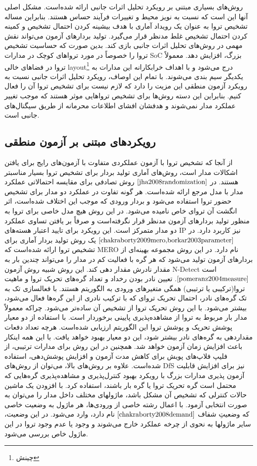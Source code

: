 روش‌های بسیاری مبتنی بر رویکرد تحلیل اثرات جانبی ارائه شده‌است. مشکل اصلی آنها این است که نسبت به نویز محیط و تغییرات فرآیند حساس هستند. بنابراین مساله تشخیص تروا به عنوان یک رویداد آماری با هدف بیشینه کردن احتمال تشخیص و کمینه کردن احتمال تشخیص غلط مدنظر قرار می‌گیرد. تولید بردارهای آزمون می‌تواند نقش مهمی در روش‌های تحلیل اثرات جانبی بازی کند. بدین صورت که حساسیت تشخیص تروا را خصوصاً در مورد تروا‌های کوچک در مدارات SoC بزرگ، افزایش دهد. معمولاً تروا در فضاهای خالی layout\footnote{چینش} درج می‌شود و با اهداف خرابکارانه این مدارات به یکدیگر سیم بندی می‌شوند. با تمام این اوصاف، رویکرد تحلیل اثرات جانبی نسبت به رویکرد آزمون منطقی این مزیت را دارد که لازم نیست برای تشخیص تروا آن را فعال کنیم. بنابراین این دسته روش‌ها برای تشخیص تروا‌هایی موثر هستند که موجب تغییر عملکرد مدار نمی‌شوند و هدفشان افشای اطلاعات محرمانه از طریق سیگنال‌های جانبی است.
\subsection{رویکردهای مبتنی بر آزمون منطقی}
از آنجا که تشخیص تروا با آزمون عملکردی متفاوت با آزمون‌های رایج برای یافتن اشکالات مدار است، روش‌های آماری تولید بردار برای تشخیص تروا بسیار مناسبتر هستند. در $\cite{jha2008randomization}$ روش تصادفی برای مقایسه احتمالاتی عملکرد مدار با مدل مرجع ارائه شده‌است. هر گونه تفاوت در عملکرد دو مدار برای تشخیص حضور تروا استفاده می‌شود و بردار ورودی که موجب این اختلاف شده‌است، اثر انگشت آن تروای خاص نامیده می‌شود. در این روش هیچ مدل خاصی برای تروا به منظور تولید بردارهای آزمون مدنظر قرار نگرفته‌است و صرفاً بر یافتن تساوی عملکرد دو مدار متمرکز است. این رویکرد برای تایید اعتبار هسته‌های IP نیز کاربرد دارد.
در $\cite{chakraborty2009mero,borkar2003parameter}$ یک روش تولید بردار آماری برای تشخیص تروا ارائه شده‌است که MERO نام دارد. در این روش مجموعه بهینه‌ای از بردارهای آزمون تولید می‌شود که هر گره با فعالیت کم در مدار را می‌تواند چندین بار به مقدار نادرش مقدار دهی کند. این روش شبیه روش آزمون N-Detect است $\cite{pomeranz2004measure}$. تعیین نادر بودن رخداد و تعداد گره‌های تحریک تروا و ماهیت تروا(ترکیبی یا ترتیبی) همگی متغیرهای ورودی به الگوریتم هستند. با فعالسازی تک به تک گره‌های نادر، احتمال تحریک تروای که با ترکیب نادری از این گره‌ها فعال می‌شود، بیشتر می‌شود. با این روش تحریک تروا از تشخیص آن ساده‌تر می‌شود. چراکه معمولاً مدار بار مربوط به تروا از مشاهده‌پذیری پایینی برخوردار است. با استفاده از دو معیار پوشش تحریک و پوشش تروا این الگوریتم ارزیابی شده‌است. هرچه تعداد دفعات مقداردهی به گره‌های نادر بیشتر شود، این دو معیار بهبود خواهد یافت. با این همه اینکار باعث افزایش زمان آزمون خواهد شد. همچنین در این روش برای مدارات ترتیبی، از فلیپ فلاپ‌های پویش برای کاهش مدت آزمون و افزایش پوشش‌دهی، استفاده شده‌است.
علاوه بر روش‌های بالا، می‌توان از روش‌های DfS نیز برای افزایش قابلیت آزمون پذیری مدارات بزرگ با رویکرد بهبود کنترل‌پذیری و مشاهده‌پذیری گره‌هایی که محتمل است گره تحریک تروا یا گره بار باشند، استفاده کرد. با افزودن یک ماشین حالات کنترلی که تشخیص آن مشکل باشد، ماژولهای مختلف داخل مدار را می‌توان به صورت انتخابی آزمود. با اعمال رشته خاصی از ورودی‌ها، هر ماژول به وضعیت خاصی که وضعیتِ شفاف $\cite{chakraborty2008demand}$ نام دارد، وارد می‌شود. در این وضعیت، سایر ماژولها به نحوی از چرخه عملکرد خارج می‌شوند و وجود یا عدم وجود تروا در این ماژول خاص بررسی می‌شود.
